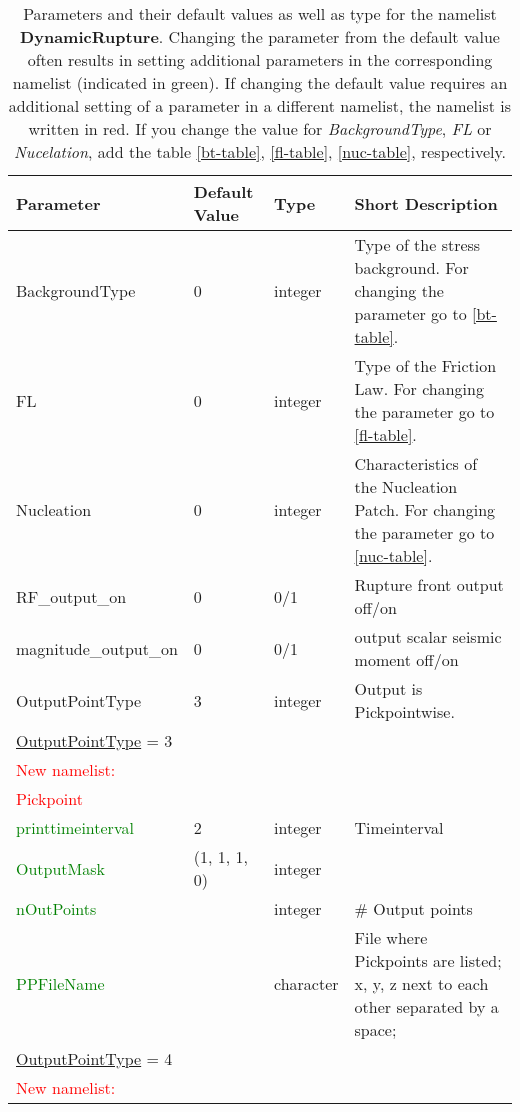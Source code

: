 \documentclass[12pt,twoside]{article}
\begin{document}
\begin{table}[H]
\caption{Parameters and their default values as well as type for the namelist \textbf{DynamicRupture}.
         Changing the parameter from the default value often results in setting additional parameters 
         in the corresponding namelist (indicated in green). 
         If changing the default value requires an additional setting of a parameter in a different namelist, 
         the namelist is written in red. If you change the value for 
         \textit{BackgroundType}, \textit{FL} or \textit{Nucelation}, add the table \ref{bt-table}, 
         \ref{fl-table}, \ref{nuc-table}, respectively.}
\begin{center}
\begin{tabular}{|p{4.8cm}|p{2.4cm}|p{2cm}|p{5cm}|}
\hline
Parameter & Default Value & Type & Short Description \\
\hline
\hline
BackgroundType & 0 & integer & Type of the stress background. For changing the parameter go to \ref{bt-table}.\\
\hline
FL & 0 & integer & Type of the Friction Law. For changing the parameter go to \ref{fl-table}.\\
\hline
Nucleation & 0 & integer &  Characteristics of the Nucleation Patch. For changing the parameter go to \ref{nuc-table}.\\
\hline
RF\_output\_on & 0 & 0/1 & Rupture front output off/on\\
\hline
magnitude\_output\_on & 0 & 0/1 & output scalar seismic moment off/on\\
\hline
OutputPointType & 3 & integer & Output is Pickpointwise.\\
\hdashline
\uline{OutputPointType} = 3 & & &\\
\textcolor{red}{New namelist:} & & &\\
\textcolor{red}{Pickpoint} & & &\\
\textcolor{green}{printtimeinterval} & 2 & integer & Timeinterval\\
\textcolor{green}{OutputMask} & (1, 1, 1, 0) & integer & \\
\textcolor{green}{nOutPoints} & & integer & \# Output points\\
\textcolor{green}{PPFileName} & & character& File where Pickpoints are listed; x, y, z next to each other separated by a space;\\
\hdashline
\uline{OutputPointType} = 4 & & &\\
\textcolor{red}{New namelist:} & & &\\

\end{tabular}
\end{center}
\end{table}
\end{document}

